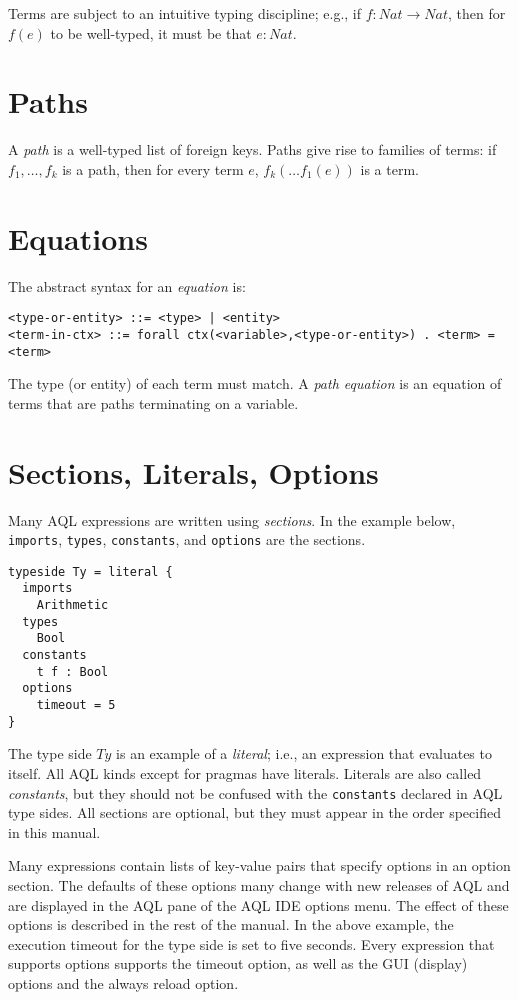 \documentclass[10pt]{book}
\begin{document}
Terms are subject to an intuitive typing discipline; e.g., if $f : Nat \to Nat$, then for $f(e)$ to be well-typed, it must be that $e : Nat$.

\section{Paths}
A {\it path} is a well-typed list of foreign keys. Paths give rise to families of terms: if $f_1, \ldots, f_k$ is a path, then for every term $e$, $f_k( \ldots f_1(e))$ is a term.

\section{Equations}
The abstract syntax for an {\it equation} is: 
\begin{verbatim}
<type-or-entity> ::= <type> | <entity>
<term-in-ctx> ::= forall ctx(<variable>,<type-or-entity>) . <term> = <term>
\end{verbatim}
The  type (or entity) of each term must match.  A {\it path equation} is an equation of terms that are paths terminating on a variable.

\section{Sections, Literals, Options}
\label{section10}

Many AQL expressions are written using {\it sections}. In the example below, {\tt imports}, {\tt types}, {\tt constants}, and {\tt options} are the sections.
\begin{verbatim}
typeside Ty = literal {
  imports
    Arithmetic
  types
    Bool
  constants
    t f : Bool	
  options
    timeout = 5  
}
\end{verbatim}
The type side $Ty$ is an example of a {\it literal}; i.e., an expression that evaluates to itself.  All AQL kinds except for pragmas have literals.  Literals are also called {\it constants}, but they should not be confused with the {\tt constants} declared in AQL type sides.  All sections are optional, but they must appear in the order specified in this manual. 

Many expressions contain lists of key-value pairs that specify options in an option section.  The defaults of these options many change with new releases of AQL and are displayed in the AQL pane of the AQL IDE options menu.  The effect of these options is described in the rest of the manual.  In the above example, the execution timeout for the type side is set to five seconds.  Every expression that supports options supports the timeout option, as well as the GUI (display) options and the always reload option.  
\end{document}
